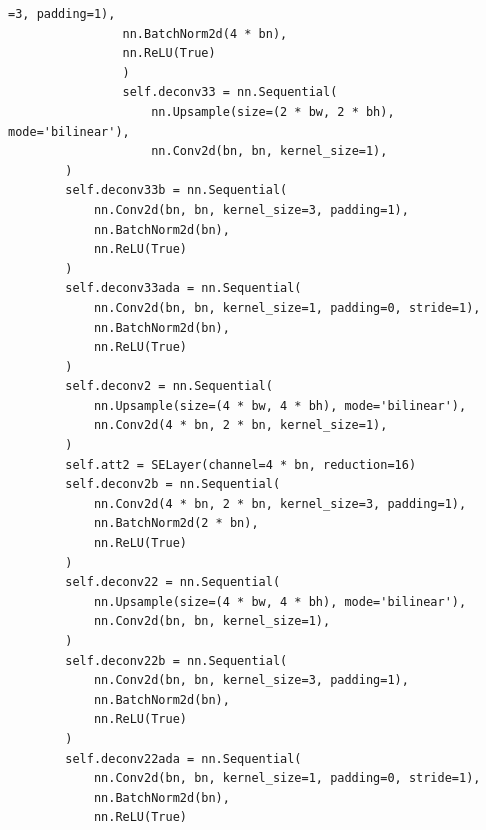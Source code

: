 \begin{lstlisting}[caption= Продолжение листинга A.1]
    =3, padding=1),
                nn.BatchNorm2d(4 * bn),
                nn.ReLU(True)
                )
                self.deconv33 = nn.Sequential(
                    nn.Upsample(size=(2 * bw, 2 * bh), mode='bilinear'),
                    nn.Conv2d(bn, bn, kernel_size=1),
        )
        self.deconv33b = nn.Sequential(
            nn.Conv2d(bn, bn, kernel_size=3, padding=1),
            nn.BatchNorm2d(bn),
            nn.ReLU(True)
        )
        self.deconv33ada = nn.Sequential(
            nn.Conv2d(bn, bn, kernel_size=1, padding=0, stride=1),
            nn.BatchNorm2d(bn),
            nn.ReLU(True)
        )
        self.deconv2 = nn.Sequential(
            nn.Upsample(size=(4 * bw, 4 * bh), mode='bilinear'),
            nn.Conv2d(4 * bn, 2 * bn, kernel_size=1),
        )
        self.att2 = SELayer(channel=4 * bn, reduction=16)
        self.deconv2b = nn.Sequential(
            nn.Conv2d(4 * bn, 2 * bn, kernel_size=3, padding=1),
            nn.BatchNorm2d(2 * bn),
            nn.ReLU(True)
        )
        self.deconv22 = nn.Sequential(
            nn.Upsample(size=(4 * bw, 4 * bh), mode='bilinear'),
            nn.Conv2d(bn, bn, kernel_size=1),
        )
        self.deconv22b = nn.Sequential(
            nn.Conv2d(bn, bn, kernel_size=3, padding=1),
            nn.BatchNorm2d(bn),
            nn.ReLU(True)
        )
        self.deconv22ada = nn.Sequential(
            nn.Conv2d(bn, bn, kernel_size=1, padding=0, stride=1),
            nn.BatchNorm2d(bn),
            nn.ReLU(True)
\end{lstlisting}

